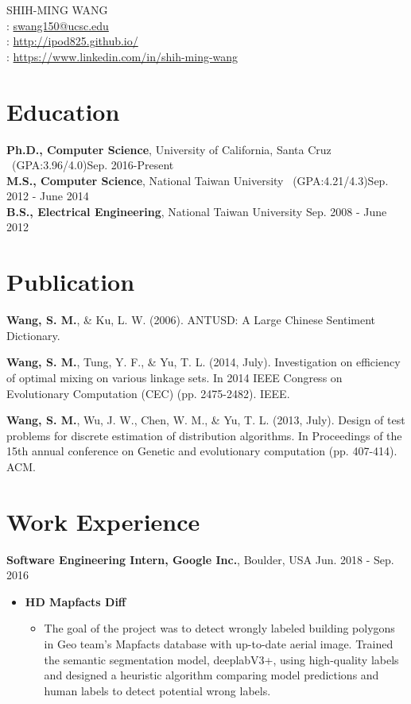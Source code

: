 \documentclass[a4paper,10pt]{article}
\begin{document}
\pagestyle{empty} %

\par{
    \center
{\Huge SHIH-MING WANG}\\
\faEnvelope: \href{mailto:swang150@ucsc.edu}{swang150@ucsc.edu} \\
\faUser: \href{http://ipod825.github.io/}{http://ipod825.github.io/}\\
\faLinkedin: \href{https://www.linkedin.com/in/shih-ming-wang-73aa3769/}{https://www.linkedin.com/in/shih-ming-wang}\\
\bigskip\par}

\section{Education}
    \textbf{Ph.D., Computer Science}, University of California, Santa Cruz \ (GPA:3.96/4.0)\hfill Sep. 2016-Present\\
    \textbf{M.S., Computer Science}, National Taiwan University \ (GPA:4.21/4.3)\hfill Sep. 2012 - June 2014 \\
    \textbf{B.S., Electrical Engineering}, National Taiwan University \hfill Sep. 2008 - June 2012

\section{Publication}
\textbf{Wang, S. M.}, \& Ku, L. W. (2006). ANTUSD: A Large Chinese Sentiment Dictionary.

\textbf{Wang, S. M.}, Tung, Y. F., \& Yu, T. L. (2014, July). Investigation on efficiency of optimal mixing on various linkage sets. In 2014 IEEE Congress on Evolutionary Computation (CEC) (pp. 2475-2482). IEEE.

\textbf{Wang, S. M.}, Wu, J. W., Chen, W. M., \& Yu, T. L. (2013, July). Design of test problems for discrete estimation of distribution algorithms. In Proceedings of the 15th annual conference on Genetic and evolutionary computation (pp. 407-414). ACM.

\section{Work Experience}
\textbf{Software Engineering Intern, Google Inc.}, Boulder, USA \hfill Jun. 2018 - Sep. 2016 \par
\begin{itemize}
    \item \textbf{HD Mapfacts Diff}
    \begin{itemize}
        \item The goal of the project was to detect wrongly labeled building polygons in Geo team's Mapfacts database with up-to-date aerial image. Trained the semantic segmentation model, deeplabV3+, using high-quality labels and designed a heuristic algorithm comparing model predictions and human labels to detect potential wrong labels.
    \end{itemize}
\end{itemize}
\end{document}
